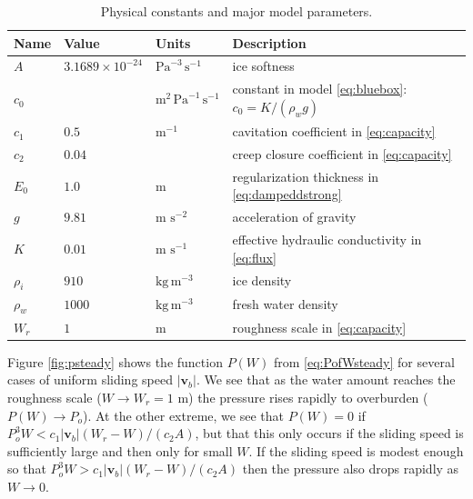 \documentclass[11pt,final]{amsart}%
\newcommand\bv{\mathbf{v}}
\begin{document}
\begin{table}[ht]
  \centering
  \caption{Physical constants and major model parameters.}
  \begin{tabular}{lllp{3.0in}} 
    \textbf{Name} & \textbf{Value} & \textbf{Units} & \textbf{Description}\\
\hline
    $A$ & $3.1689\times 10^{-24}$ & $\text{Pa}^{-3}\,\text{s}^{-1}$ & ice softness \citep{EISMINT96} \\
    $c_0$ &  & $\text{m}^{2}\,\text{Pa}^{-1}\,\text{s}^{-1}$ & constant in model \eqref{eq:bluebox}: $c_0=K/(\rho_w g)$ \\
    $c_1$ & $0.5$ & $\text{m}^{-1}$ & cavitation coefficient in \eqref{eq:capacity} \\
    $c_2$ & $0.04$ & & creep closure coefficient in \eqref{eq:capacity} \\
    $E_0$ & $1.0$ & m & regularization thickness in \eqref{eq:dampeddstrong} \\
    $g$ & $9.81$ & m $\text{s}^{-2}$ & acceleration of gravity \\
    $K$ & $0.01$ & m $\text{s}^{-1}$ & effective hydraulic conductivity in \eqref{eq:flux} \\ %
    $\rho_i$ & $910$ & $\text{kg}\,\text{m}^{-3}$ & ice density \citep{GreveBlatter2009} \\
    $\rho_w$ & $1000$ & $\text{kg}\,\text{m}^{-3}$ & fresh water density \citep{GreveBlatter2009} \\
    $W_r$ & $1$ & $\text{m}$ & roughness scale in \eqref{eq:capacity} \\
    \hline
  \end{tabular}
 \label{tab:constants}
\end{table}

Figure \ref{fig:psteady} shows the function $P(W)$ from \eqref{eq:PofWsteady} for several cases of uniform sliding speed $|\bv_b|$.  We see that as the water amount reaches the roughness scale ($W\to W_r=1$ m) the pressure rises rapidly to overburden ($P(W) \to P_o$).  At the other extreme, we see that $P(W)=0$ if $P_o^3 W < c_1 |\bv_b| (W_r - W) / (c_2 A)$, but that this only occurs if the sliding speed is sufficiently large and then only for small $W$.  If the sliding speed is modest enough so that $P_o^3 W > c_1 |\bv_b| (W_r - W) / (c_2 A)$ then the pressure also drops rapidly as $W\to 0$.
\end{document}
